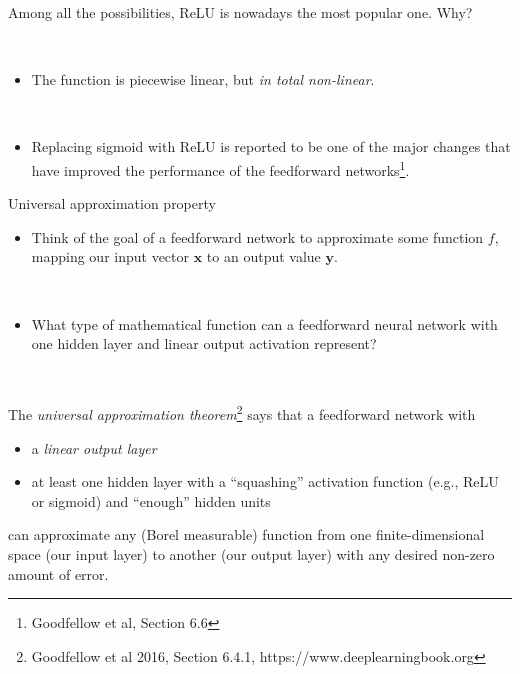 \documentclass[
  10pt,
  ignorenonframetext,
  twocolumn]{beamer}
\providecommand{\tightlist}{%
  \setlength{\itemsep}{0pt}\setlength{\parskip}{0pt}}
\begin{document}
\begin{frame}
Among all the possibilities, ReLU is nowadays the most popular one. Why?

\(~\)

\begin{itemize}
\tightlist
\item
  The function is piecewise linear, but \emph{in total non-linear}.
\end{itemize}

\(~\)

\begin{itemize}
\tightlist
\item
  Replacing sigmoid with ReLU is reported to be one of the major changes
  that have improved the performance of the feedforward
  networks\footnote{Goodfellow et al, Section 6.6}.
\end{itemize}
\end{frame}

\begin{frame}
\begin{block}{Universal approximation property}
\label{universal-approximation-property}
\(~\)

\begin{itemize}
\tightlist
\item
  Think of the goal of a feedforward network to approximate some
  function \(f\), mapping our input vector \({\boldsymbol x}\) to an
  output value \({\boldsymbol y}\).
\end{itemize}

\(~\)

\begin{itemize}
\tightlist
\item
  What type of mathematical function can a feedforward neural network
  with one hidden layer and linear output activation represent?
\end{itemize}

\(~\) \pause

The \emph{universal approximation
theorem}\footnote{Goodfellow et al 2016, Section 6.4.1, https://www.deeplearningbook.org}
says that a feedforward network with \vspace{2mm}

\begin{itemize}
\tightlist
\item
  a \emph{linear output layer}
\item
  at least one hidden layer with a ``squashing'' activation function
  (e.g., ReLU or sigmoid) and ``enough'' hidden units
\end{itemize}

\vspace{2mm}

can approximate any (Borel measurable) function from one
finite-dimensional space (our input layer) to another (our output layer)
with any desired non-zero amount of error.
\end{block}
\end{frame}
\end{document}

